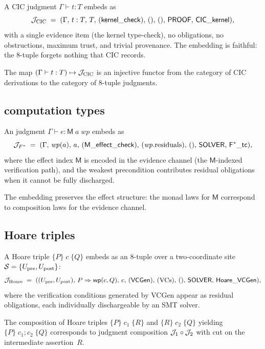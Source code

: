\documentclass[11pt]{article}
\begin{document}
A CIC judgment $\Gamma \vdash t : T$ embeds as
\[
  \mathcal{J}_{\mathrm{CIC}} \;=\;
  (\Gamma,\,t : T,\,T,\,(\mathsf{kernel\_check}),\,(),\,(),\,\mathsf{PROOF},\,\mathsf{CIC\_kernel}),
\]
with a single evidence item (the kernel type-check), no obligations,
no obstructions, maximum trust, and trivial provenance.  The embedding
is faithful: the 8-tuple forgets nothing that CIC records.

\begin{proposition}
The map $(\Gamma \vdash t : T) \mapsto \mathcal{J}_{\mathrm{CIC}}$ is an injective
functor from the category of CIC derivations to the category of 8-tuple
judgments.
\end{proposition}

\subsection{\Fstar{} computation types}

An \Fstar{} judgment $\Gamma \vdash e : \mathsf{M}\;a\;\mathit{wp}$ embeds as
\[
  \mathcal{J}_{F^*} \;=\;
  (\Gamma,\,\mathit{wp}(a),\,a,\,(\mathsf{M\_effect\_check}),\,(\mathit{wp}.\mathrm{residuals}),\,(),\,\mathsf{SOLVER},\,\mathsf{F^*\_tc}),
\]
where the effect index $\mathsf{M}$ is encoded in the evidence channel
(the $\mathsf{M}$-indexed verification path), and the weakest precondition
contributes residual obligations when it cannot be fully discharged.

\begin{proposition}
The \Fstar{} embedding preserves the effect structure: the monad laws
for $\mathsf{M}$ correspond to composition laws for the evidence channel.
\end{proposition}

\subsection{Hoare triples}

A Hoare triple $\{P\}\;c\;\{Q\}$ embeds as an 8-tuple over a two-coordinate
site $\mathcal{S} = \{U_{\mathrm{pre}}, U_{\mathrm{post}}\}$:
\[
  \mathcal{J}_{\mathrm{Hoare}} \;=\;
  ((U_{\mathrm{pre}}, U_{\mathrm{post}}),\,P \Rightarrow \mathsf{wp}(c, Q),\,c,\,(\mathsf{VCGen}),\,(\mathrm{VCs}),\,(),\,\mathsf{SOLVER},\,\mathsf{Hoare\_VCGen}),
\]
where the verification conditions generated by VCGen appear as residual
obligations, each individually dischargeable by an SMT solver.

\begin{proposition}
The composition of Hoare triples
$\{P\}\;c_1\;\{R\}$ and $\{R\}\;c_2\;\{Q\}$ yielding
$\{P\}\;c_1;c_2\;\{Q\}$ corresponds to judgment composition
$\mathcal{J}_1 \circ \mathcal{J}_2$ with cut on the intermediate assertion~$R$.
\end{proposition}
\end{document}
